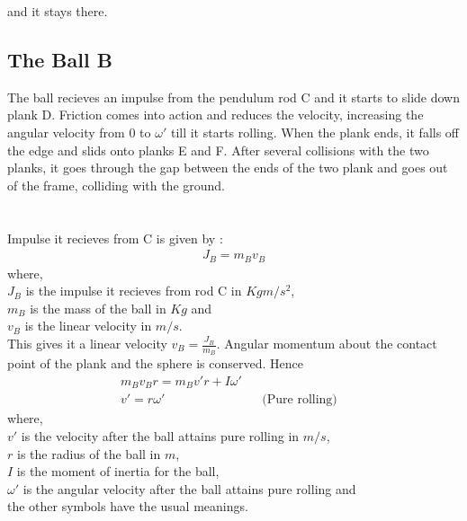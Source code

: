 \documentclass[11pt]{article}
\begin{document}
and it stays there.

\pagebreak

\subsection{The Ball B}
The ball recieves an impulse from the pendulum rod C and it starts to slide down plank D. Friction comes into action and reduces the velocity, increasing the angular velocity from $0$ to $\omega '$ till it starts rolling. When the plank ends, it falls off the edge and slids onto planks E and F. After several collisions with the two planks, it goes through the gap between the ends of the two plank and goes out of the frame, colliding with the ground.\\
\\
\setlength\fboxsep{2pt}
\setlength\fboxrule{1pt}
\\

Impulse it recieves from C is given by \cite{halliday}:
\begin{align}
J_B = m_B v_B
\end{align}
where,\\
$J_B$ is the impulse it recieves from rod C in $Kg m/s^2$,\\
$m_B$ is the mass of the ball in $Kg$ and\\
$v_B$ is the linear velocity in $m/s$.\\

This gives it a linear velocity $v_B = \frac{J_B}{m_B}$. Angular momentum about the contact point of the plank and the sphere is conserved. Hence
\begin{align}
m_B v_B r = m_B v'r + I\omega '
\\
v' = r\omega ' &&\mbox{(Pure rolling)}&
\end{align}
where,\\
$v'$ is the velocity after the ball attains pure rolling in $m/s$,\\
$r$ is the radius of the ball in $m$,\\
$I$ is the moment of inertia for the ball,\\
$\omega '$ is the angular velocity after the ball attains pure rolling and\\
the other symbols have the usual meanings.\\
\end{document}
